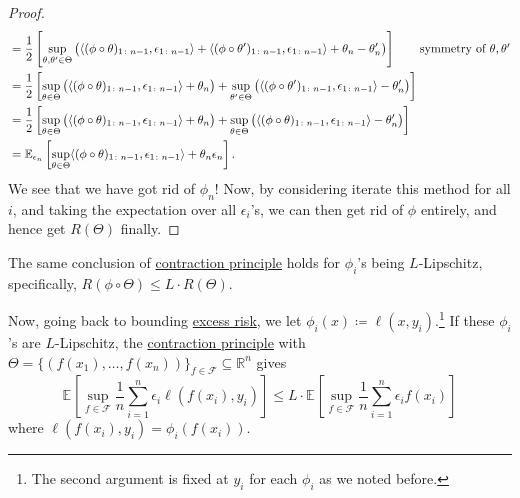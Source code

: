 \begin{proof}
\begin{align*}
		 & = \frac{1}{2} \left[ \sup _{\theta , \theta ^{\prime} \in \Theta } \big(\langle (\phi \circ \theta )_{1 \colon n-1}, \epsilon _{1 \colon n-1} \rangle+ \langle (\phi \circ \theta ^{\prime} )_{1\colon n-1} , \epsilon _{1 \colon n-1} \rangle + \theta _n - \theta _n^{\prime} \big) \right] \tag*{symmetry of \(\theta , \theta ^{\prime} \)} \\
		 & = \frac{1}{2} \left[ \sup _{\theta \in \Theta } \big( \langle (\phi \circ \theta )_{1 \colon n-1}, \epsilon _{1 \colon n-1} \rangle + \theta _n \big) + \sup _{\theta ^{\prime} \in \Theta } \big( \langle (\phi \circ \theta ^{\prime} )_{1\colon n-1} , \epsilon _{1 \colon n-1} \rangle - \theta _n^{\prime} \big) \right]                   \\
		 & = \frac{1}{2} \left[ \sup _{\theta \in \Theta } \big( \langle (\phi \circ \theta )_{1 \colon n-1}, \epsilon _{1 \colon n-1} \rangle + \theta _n \big) + \sup _{\theta \in \Theta } \big( \langle (\phi \circ \theta )_{1\colon n-1} , \epsilon _{1 \colon n-1} \rangle - \theta _n^{\prime} \big) \right]                                       \\
		 & = \mathbb{E}_{\epsilon _n}\left[ \sup _{\theta \in \Theta } \langle (\phi \circ \theta )_{1 \colon n-1} , \epsilon _{1 \colon n-1} \rangle + \theta _n \epsilon _n \right].
	\end{align*}
	We see that we have got rid of \(\phi _n\)! Now, by considering iterate this method for all \(i\), and taking the expectation over all \(\epsilon _i\)'s, we can then get rid of \(\phi \) entirely, and hence get \(R(\Theta )\) finally.
\end{proof}

\begin{corollary}\label{col:contraction-principle}
	The same conclusion of \hyperref[thm:contraction-principle]{contraction principle} holds for \(\phi _i\)'s being \(L\)-Lipschitz, specifically, \(R(\phi \circ \Theta ) \leq L\cdot R(\Theta )\).
\end{corollary}

Now, going back to bounding \hyperref[def:excess-risk]{excess risk}, we let \(\phi _i (x) \coloneqq \ell (x, y_i)\).\footnote{The second argument is fixed at \(y_i\) for each \(\phi _i\) as we noted before.} If these \(\phi _i\)'s are \(L\)-Lipschitz, the \hyperref[col:contraction-principle]{contraction principle} with \(\Theta = \{ (f(x_1), \dots , f(x_n)) \} _{f\in \mathscr{F} } \subseteq \mathbb{R} ^n \) gives
\[
	\mathbb{E}_{}\left[\sup _{f\in \mathscr{F} } \frac{1}{n} \sum_{i=1}^{n} \epsilon _i \ell (f(x_i), y_i) \right]
	\leq L\cdot \mathbb{E}_{}\left[\sup _{f\in \mathscr{F} } \frac{1}{n} \sum_{i=1}^{n} \epsilon _i f(x_i) \right]
\]
where \(\ell (f(x_i), y_i) = \phi _i(f(x_i))\).


